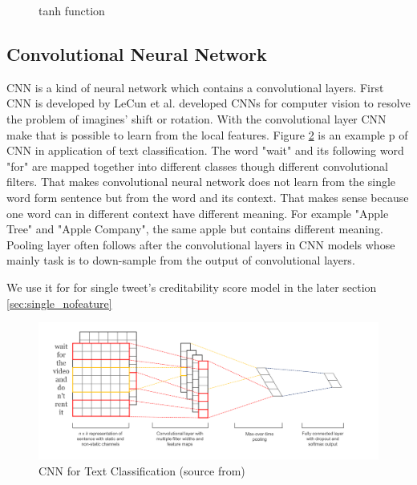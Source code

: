  \begin{figure}[h]
\center
{}
   \caption{tanh function}
\label{fig:tanh}
\end{figure}
\newpage
 \subsection{Convolutional Neural Network} %
CNN is a kind of neural network which contains a convolutional layers. First CNN is developed by LeCun et al. developed CNNs \cite{lecun1989backpropagation} for computer vision to resolve the problem of imagines' shift or rotation. With the convolutional layer CNN make that is possible to learn from the local features. Figure \ref{fig:cnn2} is an example p of CNN in application of text classification. The word "wait" and its following word "for" are mapped together into different classes though different convolutional filters. That makes convolutional neural network does not learn from the single word form sentence but from the word and its context. That makes sense because one word can in different context have different meaning. For example "Apple Tree" and "Apple Company", the same apple but contains different meaning. 
 Pooling layer often follows after the convolutional layers in CNN models whose mainly task is to down-sample from the output of convolutional layers.  
 
 We use it for for single tweet's creditability score model in the later section \ref{sec:single_nofeature}
   


 \begin{figure}[!h]
\centering
\includegraphics[width=1\columnwidth]{images/CNN.png}
\caption{CNN for Text Classification (source from\cite{kim2014convolutional}) }
\label{fig:cnn2}
\end{figure}



